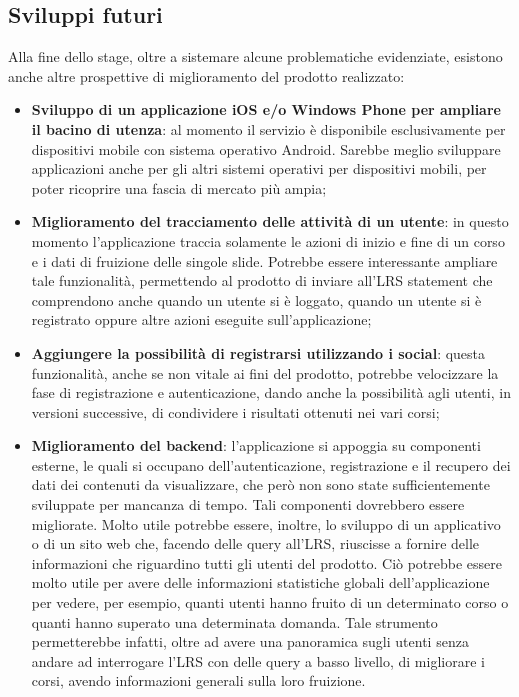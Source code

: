 \documentclass[../Tesi.tex]{subfiles}
\begin{document}
	\subsection{Sviluppi futuri}
	Alla fine dello stage, oltre a sistemare alcune problematiche evidenziate, esistono anche altre prospettive di miglioramento del prodotto realizzato:
	\begin{itemize}
		\item \textbf{Sviluppo di un applicazione iOS e/o Windows Phone per ampliare il bacino di utenza}: al momento il servizio è disponibile esclusivamente per dispositivi mobile con sistema operativo Android. Sarebbe meglio sviluppare applicazioni anche per gli altri sistemi operativi per dispositivi mobili, per poter ricoprire una fascia di mercato più ampia;
		\item \textbf{Miglioramento del tracciamento delle attività di un utente}: in questo momento l'applicazione traccia solamente le azioni di inizio e fine di un corso e i dati di fruizione delle singole slide. Potrebbe essere interessante ampliare tale funzionalità, permettendo al prodotto di inviare all'LRS statement che comprendono anche quando un utente si è loggato, quando un utente si è registrato oppure altre azioni eseguite sull'applicazione;
		\item \textbf{Aggiungere la possibilità di registrarsi utilizzando i social}: questa funzionalità, anche se non vitale ai fini del prodotto, potrebbe velocizzare la fase di registrazione e autenticazione, dando anche la possibilità agli utenti, in versioni successive, di condividere i risultati ottenuti nei vari corsi;
		\item \textbf{Miglioramento del backend}: l'applicazione si appoggia su componenti esterne, le quali si occupano dell'autenticazione, registrazione e il recupero dei dati dei contenuti da visualizzare, che però non sono state sufficientemente sviluppate per mancanza di tempo. Tali componenti dovrebbero essere migliorate. Molto utile potrebbe essere, inoltre, lo sviluppo di un applicativo o di un sito web che, facendo delle query all'LRS, riuscisse a fornire delle informazioni che riguardino tutti gli utenti del prodotto. Ciò potrebbe essere molto utile per avere delle informazioni statistiche globali dell'applicazione per vedere, per esempio, quanti utenti hanno fruito di un determinato corso o quanti hanno superato una determinata domanda. Tale strumento permetterebbe infatti, oltre ad avere una panoramica sugli utenti senza andare ad interrogare l'LRS con delle query a basso livello, di migliorare i corsi, avendo informazioni generali sulla loro fruizione.
	\end{itemize}
\end{document}
